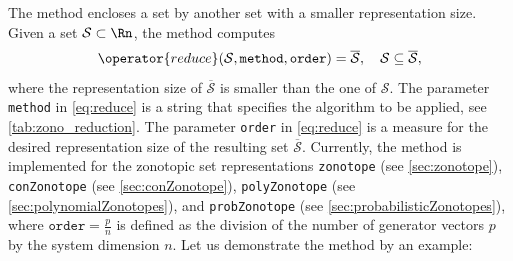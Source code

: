 
The method  encloses a set by another set with a smaller representation size. Given a set $\mathcal{S} \subset \Rn$, the method  computes
\begin{equation}
	\operator{reduce}(\mathcal{S},\texttt{method},\texttt{order}) = \overline{\mathcal{S}}, ~~~ \mathcal{S} \subseteq \overline{\mathcal{S}},
	\label{eq:reduce}
\end{equation}
where the representation size of $\overline{\mathcal{S}}$ is smaller than the one of $\mathcal{S}$. The parameter \texttt{method} in \eqref{eq:reduce} is a string that specifies the algorithm to be applied, see \cref{tab:zono_reduction}. The parameter \texttt{order} in \eqref{eq:reduce} is a measure for the desired representation size of the resulting set $\overline{\mathcal{S}}$. Currently, the method  is implemented for the zonotopic set representations \texttt{zonotope} (see \cref{sec:zonotope}), \texttt{conZonotope} (see \cref{sec:conZonotope}), \texttt{polyZonotope} (see \cref{sec:polynomialZonotopes}), and \texttt{probZonotope} (see \cref{sec:probabilisticZonotopes}), where $\texttt{order} = \frac{p}{n}$ is defined as the division of the number of generator vectors $p$ by the system dimension $n$. Let us demonstrate the method  by an example:

\begin{center}
\begin{minipage}[t]{0.35\textwidth}
	\vspace{10pt}
	\footnotesize
	
\end{minipage}
\begin{minipage}[t]{0.6\textwidth}
	\vspace{0pt}
	\centering
\end{minipage}
\end{center}


